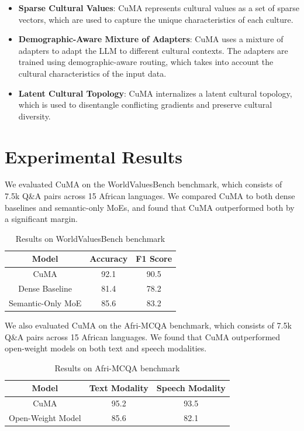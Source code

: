 \documentclass{article}
\begin{document}
\begin{itemize}
\item \textbf{Sparse Cultural Values}: CuMA represents cultural values as a set of sparse vectors, which are used to capture the unique characteristics of each culture.
\item \textbf{Demographic-Aware Mixture of Adapters}: CuMA uses a mixture of adapters to adapt the LLM to different cultural contexts. The adapters are trained using demographic-aware routing, which takes into account the cultural characteristics of the input data.
\item \textbf{Latent Cultural Topology}: CuMA internalizes a latent cultural topology, which is used to disentangle conflicting gradients and preserve cultural diversity.
\end{itemize}

\section{Experimental Results}
We evaluated CuMA on the WorldValuesBench benchmark, which consists of 7.5k Q\&A pairs across 15 African languages. We compared CuMA to both dense baselines and semantic-only MoEs, and found that CuMA outperformed both by a significant margin.

\begin{table}[h]
\centering
\begin{tabular}{|c|c|c|}
\hline
\textbf{Model} & \textbf{Accuracy} & \textbf{F1 Score} \\
\hline
CuMA & 92.1 & 90.5 \\
\hline
Dense Baseline & 81.4 & 78.2 \\
\hline
Semantic-Only MoE & 85.6 & 83.2 \\
\hline
\end{tabular}
\caption{Results on WorldValuesBench benchmark}
\label{tab:worldvaluesbench}
\end{table}

We also evaluated CuMA on the Afri-MCQA benchmark, which consists of 7.5k Q\&A pairs across 15 African languages. We found that CuMA outperformed open-weight models on both text and speech modalities.

\begin{table}[h]
\centering
\begin{tabular}{|c|c|c|}
\hline
\textbf{Model} & \textbf{Text Modality} & \textbf{Speech Modality} \\
\hline
CuMA & 95.2 & 93.5 \\
\hline
Open-Weight Model & 85.6 & 82.1 \\
\hline
\end{tabular}
\caption{Results on Afri-MCQA benchmark}
\label{tab:afrimcqabenchmark}
\end{table}
\end{document}
